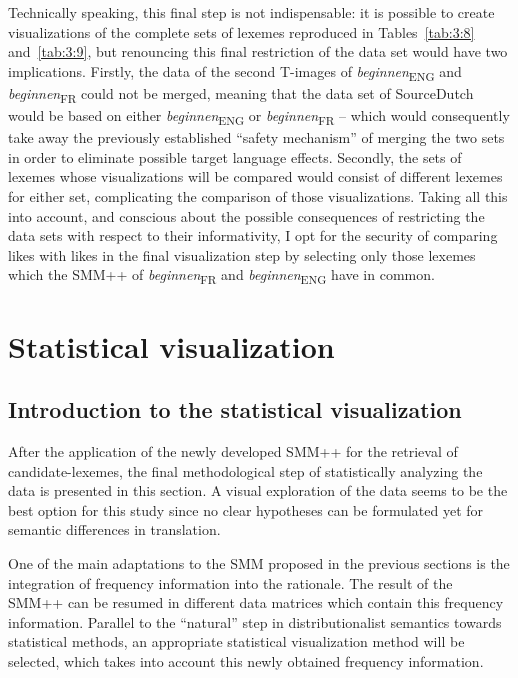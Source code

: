 Technically speaking, this final step is not indispensable: it is possible to create visualizations of the complete sets of lexemes reproduced in Tables~\ref{tab:3:8} and~\ref{tab:3:9}, but renouncing this final restriction of the data set would have two implications. Firstly, the data of the second T-images of \textit{beginnen}\textsubscript{ENG} and \textit{beginnen}\textsubscript{FR} could not be merged, meaning that the data set of SourceDutch would be based on either \textit{beginnen}\textsubscript{ENG} or \textit{beginnen}\textsubscript{FR} – which would consequently take away the previously established ``safety mechanism'' of merging the two sets in order to eliminate possible target language effects. Secondly, the sets of lexemes whose visualizations will be compared would consist of different lexemes for either set, complicating the comparison of those visualizations. Taking all this into account, and conscious about the possible consequences of restricting the data sets with respect to their informativity, I opt for the security of comparing likes with likes in the final visualization step by selecting only those lexemes which the SMM++ of \textit{beginnen}\textsubscript{FR} and \textit{beginnen}\textsubscript{ENG} have in common.


\section{Statistical visualization}\label{sec:3.7}  
\subsection{Introduction to the statistical visualization}\largerpage
After the application of the newly developed SMM++ for the retrieval of can\-di\-date-lexemes, the final methodological step of statistically analyzing the data is presented in this section. A visual exploration of the data seems to be the best option for this study since no clear hypotheses can be formulated yet for semantic differences in translation.

One of the main adaptations to the SMM proposed in the previous sections is the integration of frequency information into the rationale. The result of the SMM++ can be resumed in different data matrices which contain this frequency information. Parallel to the ``natural'' step in distributionalist semantics towards statistical methods, an appropriate statistical visualization method will be selected, which takes into account this newly obtained frequency information.

